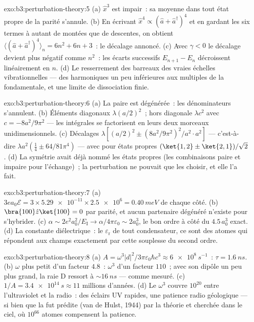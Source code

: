 \begin{solution}{exo:b3:perturbation-theory:5}
(a) $\hat x^3$ est impair~: sa moyenne dans tout état propre de la
parité s'annule. (b) En écrivant $\hat x^4 \propto (\hat a + \hat
a^\dagger)^4$ et en gardant les six termes à autant de montées que de
descentes, on obtient $\langle(\hat a + \hat a^\dagger)^4\rangle_n = 6n^2
+ 6n + 3$~: le décalage annoncé. (c) Avec $\gamma < 0$ le décalage
devient plus négatif comme $n^2$~: les écarts successifs
$E_{n+1} - E_n$ décroissent linéairement en $n$. (d) Le resserrement
des barreaux des vraies échelles vibrationnelles --- des harmoniques
un peu inférieures aux multiples de la fondamentale, et une limite de
dissociation finie.
\end{solution}

\begin{solution}{exo:b3:perturbation-theory:6}
(a) La paire est dégénérée~: les dénominateurs s'annulent. (b)
Éléments diagonaux $\lambda(a/2)^2$~; hors diagonale $\lambda c^2$ avec $c =
-8a^2/9\pi^2$ --- les intégrales se factorisent en leurs deux
morceaux unidimensionnels. (c) Décalages $\lambda[(a/2)^2 \pm
(8a^2/9\pi^2)^2/a^2\cdot a^2]$ --- c'est-à-dire $\lambda a^2(\tfrac14 \pm
64/81\pi^4)$ --- avec pour états propres $(\ket{1,2} \pm \ket{2,1})/
\sqrt2$. (d) La symétrie avait déjà nommé les états propres (les
combinaisons paire et impaire pour l'échange)~; la perturbation ne
pouvait que les choisir, et elle l'a fait.
\end{solution}

\begin{solution}{exo:b3:perturbation-theory:7}
(a) $3ea_0\mathcal E = 3 \times \num{5.29e-11} \times \num{2.5e6}
= \qty{0.40}{meV}$ de chaque côté. (b) $\bra{100}\hat z\ket{100} = 0$
par parité, et aucun partenaire dégénéré n'existe pour s'hybrider. (c)
$\alpha \sim 2e^2a_0^2/E_{\text{I}} \to \alpha/4\pi\varepsilon_0
\sim 2a_0^3$, le bon ordre à côté du $4.5\,a_0^3$ exact. (d)
La constante diélectrique~: le $\varepsilon_{\text{r}}$ de tout
condensateur, ce sont des atomes qui répondent aux champs exactement
par cette souplesse du second ordre.
\end{solution}

\begin{solution}{exo:b3:perturbation-theory:8}
(a) $A = \omega^3|d|^2/3\pi\varepsilon_0\hbar c^3 \approx
\qty{6e8}{s^{-1}}$~: $\tau = \qty{1.6}{ns}$. (b) $\omega$ plus petit
d'un facteur $4.8$~: $\omega^3$ d'un facteur $110$~; avec son dipôle
un peu plus grand, la raie D ressort à $\sim\qty{16}{ns}$ --- comme
mesuré. (c) $1/A = \qty{3.4e14}{s} \approx 11$ millions d'années. (d)
Le $\omega^3$ couvre $10^{20}$ entre l'ultraviolet et la radio~: des
éclairs UV rapides, une patience radio géologique --- si bien que la
 fut prédite (van de Hulst, 1944) par la théorie et
cherchée dans le ciel, où $10^{66}$ atomes compensent la patience.
\end{solution}

